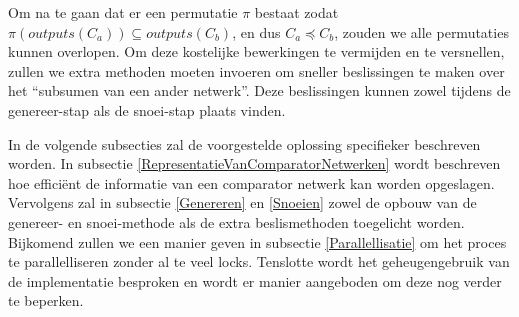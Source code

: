 \documentclass{article}
\begin{document}
Om na te gaan dat er een permutatie $\pi$ bestaat zodat ${\pi\left(outputs\left(C_{a}\right)\right) \subseteq outputs\left(C_{b}\right)}$, en dus $C_a \preceq C_{b}$, zouden we alle permutaties kunnen overlopen.
Om deze kostelijke bewerkingen te vermijden en te versnellen, zullen we extra methoden moeten invoeren om sneller beslissingen te maken over het ``subsumen van een ander netwerk''. 
Deze beslissingen kunnen zowel tijdens de genereer-stap als de snoei-stap plaats vinden.

In de volgende subsecties zal de voorgestelde oplossing specifieker beschreven worden.
In subsectie \ref{RepresentatieVanComparatorNetwerken} wordt beschreven hoe effici\"ent de informatie van een comparator netwerk kan worden opgeslagen.
Vervolgens zal in subsectie \ref{Genereren} en \ref{Snoeien} zowel de opbouw van de genereer- en snoei-methode als de extra beslismethoden toegelicht worden.
Bijkomend zullen we een manier geven in subsectie \ref{Parallellisatie} om het proces te parallelliseren zonder al te veel locks.
Tenslotte wordt het geheugengebruik van de implementatie besproken en wordt er manier aangeboden om deze nog verder te beperken.
\end{document}
